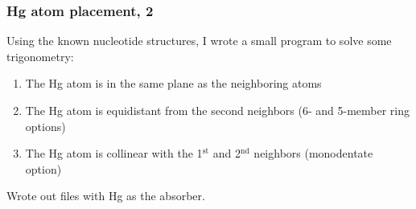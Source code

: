 \documentclass[10pt, xcolor=x11names, compress]{beamer}
\begin{document}
\begin{frame}
  \frametitle{Hg atom placement, 2}
  Using the known nucleotide structures, I wrote a small program to
  solve some trigonometry:\\[1ex]

  \begin{enumerate}
  \item The Hg atom is in the same plane as the neighboring atoms
  \item The Hg atom is equidistant from the second neighbors (6- and
    5-member ring options)
  \item The Hg atom is collinear with the 1$^{\mathrm{st}}$ and
    2$^{\mathrm{nd}}$ neighbors (monodentate option)
  \end{enumerate}

  Wrote out  files with Hg as the absorber.
\end{frame}
\end{document}
